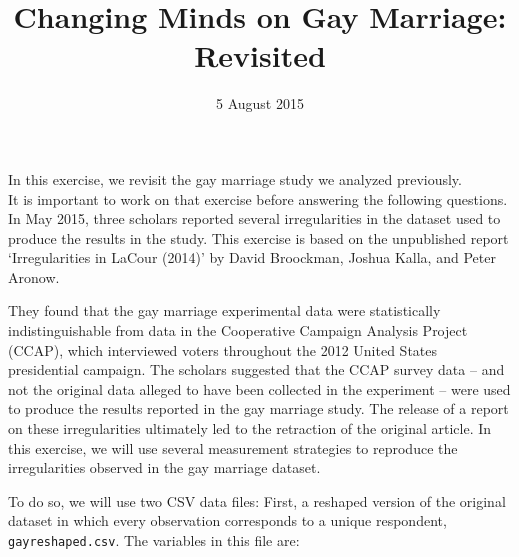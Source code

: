 \documentclass[]{article}
\title{Changing Minds on Gay Marriage: Revisited}
\author{}
\date{5 August 2015}
\begin{document}
\maketitle


In this exercise, we revisit the gay marriage study we analyzed
previously.\\It is important to work on that exercise before answering
the following questions. In May 2015, three scholars reported several
irregularities in the dataset used to produce the results in the study.
This exercise is based on the unpublished report `Irregularities in
LaCour (2014)' by David Broockman, Joshua Kalla, and Peter Aronow.

They found that the gay marriage experimental data were statistically
indistinguishable from data in the Cooperative Campaign Analysis Project
(CCAP), which interviewed voters throughout the 2012 United States
presidential campaign. The scholars suggested that the CCAP survey data
-- and not the original data alleged to have been collected in the
experiment -- were used to produce the results reported in the gay
marriage study. The release of a report on these irregularities
ultimately led to the retraction of the original article. In this
exercise, we will use several measurement strategies to reproduce the
irregularities observed in the gay marriage dataset.

To do so, we will use two CSV data files: First, a reshaped version of
the original dataset in which every observation corresponds to a unique
respondent, \texttt{gayreshaped.csv}. The variables in this file are:
\end{document}
